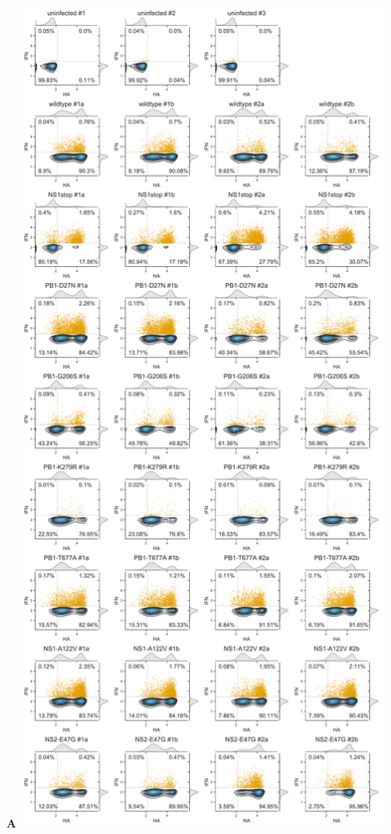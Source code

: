 \documentclass[10pt,letterpaper]{article}
\begin{document}
\begin{suppfig}
\begin{minipage}[t]{0.46\textwidth}
{\bf \Large A}
\includegraphics[width=0.9\textwidth, valign=t]{figures/Validation_Figure/SNP_flow_plot.pdf}

\end{minipage}
\end{suppfig}
\end{document}
